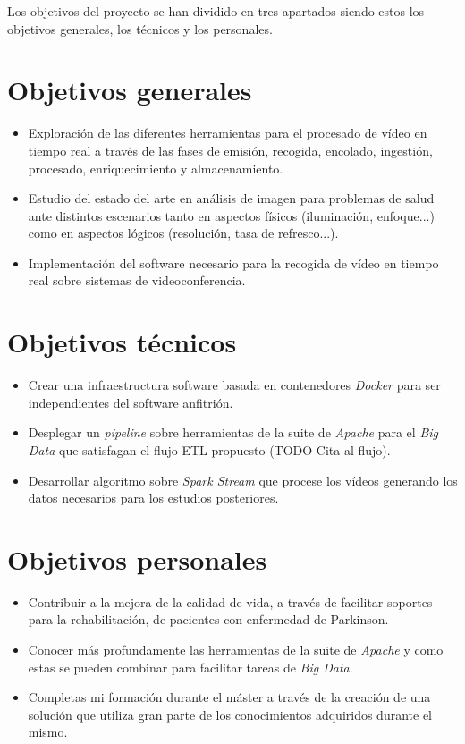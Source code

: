Los objetivos del proyecto se han dividido en tres apartados siendo estos los objetivos generales, los técnicos y los personales.

\section{Objetivos generales}

\begin{itemize}
	\item Exploración de las diferentes herramientas para el procesado de vídeo en tiempo real a través de las fases de emisión, recogida, encolado, ingestión, procesado, enriquecimiento y almacenamiento.
	\item Estudio del estado del arte en análisis de imagen para problemas de salud ante distintos escenarios tanto en aspectos físicos (iluminación, enfoque...) como en aspectos lógicos (resolución, tasa de refresco...).
	\item Implementación del software necesario para la recogida de vídeo en tiempo real sobre sistemas de videoconferencia.
\end{itemize}

\section{Objetivos técnicos}

\begin{itemize}
	\item Crear una infraestructura software basada en contenedores \textit{Docker} para ser independientes del software anfitrión.
	\item Desplegar un \textit{pipeline} sobre herramientas de la suite de \textit{Apache} para el \textit{Big Data} que satisfagan el flujo ETL propuesto (TODO Cita al flujo).
	\item Desarrollar algoritmo sobre \textit{Spark Stream} que procese los vídeos generando los datos necesarios para los estudios posteriores. 
\end{itemize}


\section{Objetivos personales}

\begin{itemize}
	\item Contribuir a la mejora de la calidad de vida, a través de facilitar soportes para la rehabilitación, de pacientes con enfermedad de Parkinson.
	\item Conocer más profundamente las herramientas de la suite de \textit{Apache} y como estas se pueden combinar para facilitar tareas de \textit{Big Data}.
	\item Completas mi formación durante el máster a través de la creación de una solución que utiliza gran parte de los conocimientos adquiridos durante el mismo.
\end{itemize}

